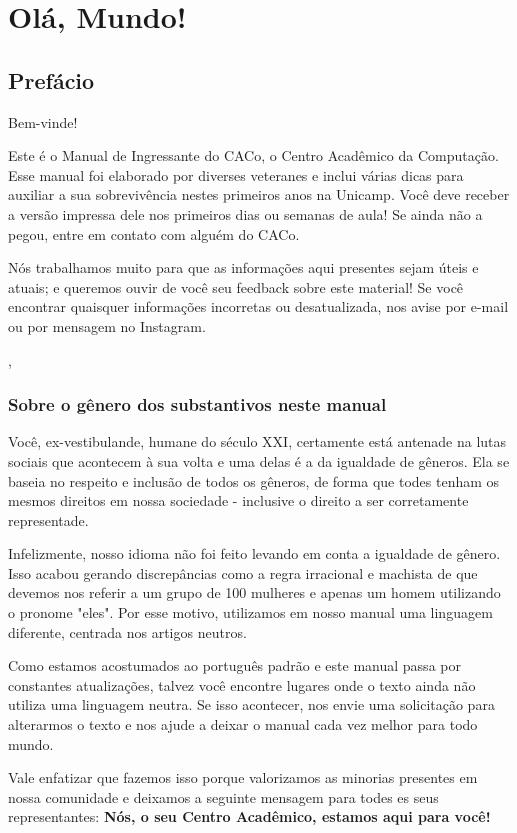 \chapter{Olá, Mundo!}

\setcounter{page}{1}

\section{Prefácio}

Bem-vinde!

Este é o Manual de Ingressante do CACo, o Centro Acadêmico da Computação. Esse manual foi elaborado por diverses veteranes e inclui várias dicas para auxiliar a sua sobrevivência nestes primeiros anos na Unicamp. Você deve receber a versão impressa dele nos primeiros dias ou semanas de aula! Se ainda não a pegou, entre em contato com alguém do CACo.

Nós trabalhamos muito para que as informações aqui presentes sejam úteis e atuais; e queremos ouvir de você seu feedback sobre este material! Se você encontrar quaisquer informações incorretas ou desatualizada, nos avise por e-mail ou por mensagem no Instagram.

\begin{tags}
     \sep {}    
\end{tags}

\subsection{Sobre o gênero dos substantivos neste manual}

Você, ex-vestibulande, humane do século XXI, certamente está antenade na lutas sociais que acontecem à sua volta e uma delas é a da igualdade de gêneros. Ela se baseia no respeito e inclusão de todos os gêneros, de forma que todes tenham os mesmos direitos em nossa sociedade - inclusive o direito a ser corretamente representade.

Infelizmente, nosso idioma não foi feito levando em conta a igualdade de gênero. Isso acabou gerando discrepâncias como a regra irracional e machista de que devemos nos referir a um grupo de 100 mulheres e apenas um homem utilizando o pronome "eles". Por esse motivo, utilizamos em nosso manual uma linguagem diferente, centrada nos artigos neutros.

Como estamos acostumados ao português padrão e este manual passa por constantes atualizações, talvez você encontre lugares onde o texto ainda não utiliza uma linguagem neutra. Se isso acontecer, nos envie uma solicitação para alterarmos o texto e nos ajude a deixar o manual cada vez melhor para todo mundo.

Vale enfatizar que fazemos isso porque valorizamos as minorias presentes em nossa comunidade e deixamos a seguinte mensagem para todes es seus representantes: \textbf{Nós, o seu Centro Acadêmico, estamos aqui para você!}







